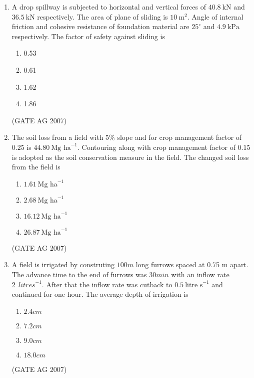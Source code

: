 \documentclass[journal,12pt,onecolumn]{IEEEtran}
\theoremstyle{remark}
\begin{document}
\begin{enumerate}
\item A drop spillway is subjected to horizontal and vertical forces of $40.8\ \text{kN}$ and $36.5\ \text{kN}$ respectively. The area of plane of sliding is $10\ \text{m}^2$. Angle of internal friction and cohesive resistance of foundation material are $25^\circ$ and $4.9\ \text{kPa}$ respectively. The factor of safety against sliding is
\begin{multicols}{4}
\begin{enumerate}
\item 0.53
\item 0.61
\item 1.62
\item 1.86
\end{enumerate}
\end{multicols}
\hfill(GATE AG 2007)

\item The soil loss from a field with $5\%$ slope and for crop management factor of $0.25$ is $44.80\ \text{Mg ha}^{-1}$. Contouring along with crop management factor of $0.15$ is adopted as the soil conservation measure in the field. The changed soil loss from the field is
\begin{multicols}{4}
\begin{enumerate}
\item $1.61\ \text{Mg ha}^{-1}$
\item $2.68\ \text{Mg ha}^{-1}$
\item $16.12\ \text{Mg ha}^{-1}$
\item $26.87\ \text{Mg ha}^{-1}$
\end{enumerate}
\end{multicols}
\hfill(GATE AG 2007)

\item A field is irrigated by construting $100 m$ long furrows spaced at 0.75 m apart. The advance time to the end of furrows was $30 min$ with an inflow rate $2\ \ {litre s}^{-1}$. After that the inflow rate was cutback to  $0.5\ \text{litre s}^{-1}$ and continued for one hour. The average depth of irrigation is 
\begin{multicols}{4}
    \begin{enumerate}
        \item $2.4 cm$
        \item $7.2 cm$
        \item $9.0 cm$
        \item $18.0 cm$
    \end{enumerate}
\end{multicols}
\hfill(GATE AG 2007)


\end{enumerate}
\end{document}
